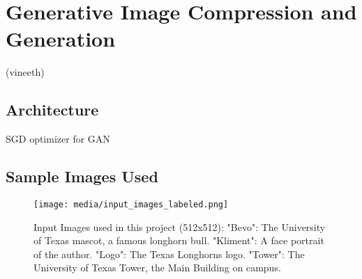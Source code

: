 \section{Generative Image Compression and Generation}

(vineeth)

\subsection{Architecture}

SGD optimizer for GAN

\subsection{Sample Images Used}

\begin{figure}[H]
	\begin{center}
	\texttt{[image: media/input\_images\_labeled.png]}
	\end{center}
	\caption[Input Images]{Input Images used in this project (512x512):
    \newline
    \hspace{10pt} "Bevo": The University of Texas mascot, a famous longhorn bull.\newline
    \hspace{10pt} "Kliment": A face portrait of the author. \newline
    \hspace{10pt} "Logo": The Texas Longhorns logo.\newline
    \hspace{10pt} "Tower": The University of Texas Tower, the Main Building on campus.}
	\end{figure}







